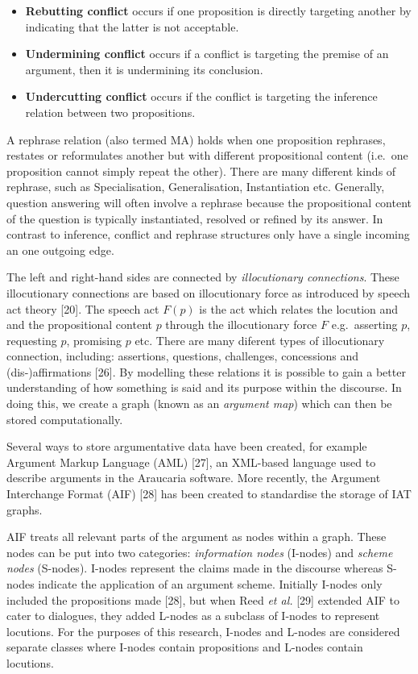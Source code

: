\documentclass[twocolumn]{article}
\providecommand{\tightlist}{%
  \setlength{\itemsep}{0pt}\setlength{\parskip}{0pt}}
\begin{document}
\begin{itemize}
\tightlist
\item
  \textbf{Rebutting conflict} occurs if one proposition is directly
  targeting another by indicating that the latter is not acceptable.
\item
  \textbf{Undermining conflict} occurs if a conflict is targeting the
  premise of an argument, then it is undermining its conclusion.
\item
  \textbf{Undercutting conflict} occurs if the conflict is targeting the
  inference relation between two propositions.
\end{itemize}

A rephrase relation (also termed MA) holds when one proposition
rephrases, restates or reformulates another but with different
propositional content (i.e.~one proposition cannot simply repeat the
other). There are many different kinds of rephrase, such as
Specialisation, Generalisation, Instantiation etc. Generally, question
answering will often involve a rephrase because the propositional
content of the question is typically instantiated, resolved or refined
by its answer. In contrast to inference, conflict and rephrase
structures only have a single incoming an one outgoing edge.

The left and right-hand sides are connected by \emph{illocutionary
connections}. These illocutionary connections are based on illocutionary
force as introduced by speech act theory {[}20{]}. The speech act
\(F(p)\) is the act which relates the locution and and the propositional
content \(p\) through the illocutionary force \(F\) e.g.~asserting
\(p\), requesting \(p\), promising \(p\) etc. There are many diferent
types of illocutionary connection, including: assertions, questions,
challenges, concessions and (dis-)affirmations {[}26{]}. By modelling
these relations it is possible to gain a better understanding of how
something is said and its purpose within the discourse. In doing this,
we create a graph (known as an \emph{argument map}) which can then be
stored computationally.

Several ways to store argumentative data have been created, for example
Argument Markup Language (AML) {[}27{]}, an XML-based language used to
describe arguments in the Araucaria software. More recently, the
Argument Interchange Format (AIF) {[}28{]} has been created to
standardise the storage of IAT graphs.

AIF treats all relevant parts of the argument as nodes within a graph.
These nodes can be put into two categories: \emph{information nodes}
(I-nodes) and \emph{scheme nodes} (S-nodes). I-nodes represent the
claims made in the discourse whereas S-nodes indicate the application of
an argument scheme. Initially I-nodes only included the propositions
made {[}28{]}, but when Reed \emph{et al.} {[}29{]} extended AIF to
cater to dialogues, they added L-nodes as a subclass of I-nodes to
represent locutions. For the purposes of this research, I-nodes and
L-nodes are considered separate classes where I-nodes contain
propositions and L-nodes contain locutions.
\end{document}
